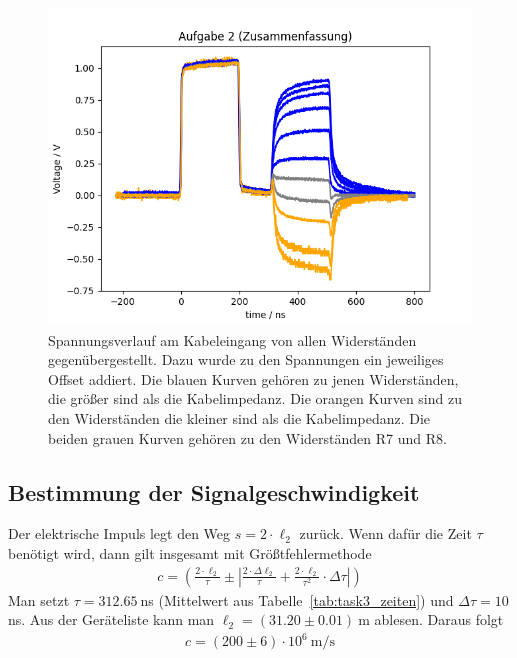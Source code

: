 \documentclass{article}
\begin{document}
\begin{figure}[H]
\centering
\caption{Spannungsverlauf am Kabeleingang von allen Widerständen gegenübergestellt. Dazu wurde zu den Spannungen ein jeweiliges Offset addiert. Die blauen Kurven gehören zu jenen Widerständen, die größer sind als die Kabelimpedanz. Die orangen Kurven sind zu den Widerständen die kleiner sind als die Kabelimpedanz. Die beiden grauen Kurven gehören zu den Widerständen R7 und R8.}
\label{fig:task2_summary}
\includegraphics[scale=0.6]{bilder/task2/task2_summary.png}
\end{figure}



\subsection{Bestimmung der Signalgeschwindigkeit}

Der elektrische Impuls legt den Weg $s = 2\cdot \ell_2$ zurück. Wenn dafür die Zeit $\tau$ benötigt wird, dann gilt insgesamt mit Größtfehlermethode
\begin{align*}
c = \left(\frac{2\cdot \ell_2}{\tau} \pm \left|\frac{2\cdot \Delta \ell_2}{\tau} + \frac{2\cdot \ell_2}{\tau^2}\cdot \Delta \tau\right|\right)
\end{align*}
Man setzt $\tau = 312.65~$ns (Mittelwert aus Tabelle~\ref{tab:task3_zeiten}) und $\Delta \tau = 10~$ns. Aus der Geräteliste kann man $\ell_2 = (31.20 \pm 0.01)~$m ablesen. Daraus folgt
\begin{align*}
c = \left(200 \pm  6\right)\cdot 10^6~\text{m/s}
\end{align*}
\end{document}

